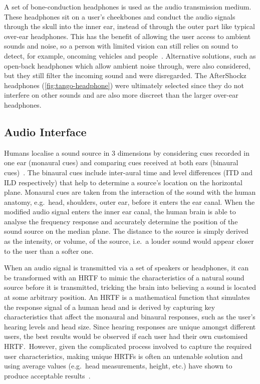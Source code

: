 \documentclass{article}
\begin{document}
A set of bone-conduction headphones is used as the audio transmission medium.
These headphones sit on a user's cheekbones and conduct the audio signals through the skull into the inner ear, instead of through the outer part like typical over-ear headphones. 
This has the benefit of allowing the user access to ambient sounds and noise, so a person with limited vision can still relies on sound to detect, for example, oncoming vehicles and people~\cite{lichtenstein2012headphone}.
Alternative solutions, such as open-back headphones which allow ambient noise through, were also considered, but they still filter the incoming sound and were disregarded.
The AfterShockz headphones (\cref{fig:tango-headphone}) were ultimately selected since they do not interfere on other sounds and are also more discreet than the larger over-ear headphones. 

\subsection{Audio Interface}

Humans localise a sound source in 3 dimensions by considering cues recorded in one ear (monaural cues) and comparing cues received at both ears (binaural cues)~\cite{blauert1997spatial,blauert1969sound}.
The binaural cues include inter-aural time and level differences (ITD and ILD respectively) that help to determine a source's location on the horizontal plane.
Monaural cues are taken from the interaction of the sound with the human anatomy, e.g.\ head, shoulders, outer ear, before it enters the ear canal.
When the modified audio signal enters the inner ear canal, the human brain is able to analyse the frequency response and accurately determine the position of the sound source on the median plane. 
The distance to the source is simply derived as the intensity, or volume, of the source, i.e.\ a louder sound would appear closer to the user than a softer one. 

When an audio signal is transmitted via a set of speakers or headphones, it can be transformed with an HRTF to mimic the characteristics of a natural sound source before it is transmitted, tricking the brain into believing a sound is located at some arbitrary position.
An HRTF is a mathematical function that simulates the response signal of a human head and is derived by capturing key characteristics that affect the monaural and binaural responses, such as the user's hearing levels and head size.
Since hearing responses are unique amongst different users, the best results would be observed if each user had their own customised HRTF.\
However, given the complicated process involved to capture the required user characteristics, making unique HRTFs is often an untenable solution and using average values (e.g.\ head measurements, height, etc.) have shown to produce acceptable results~\cite{gardner1995hrtf}.
\end{document}
